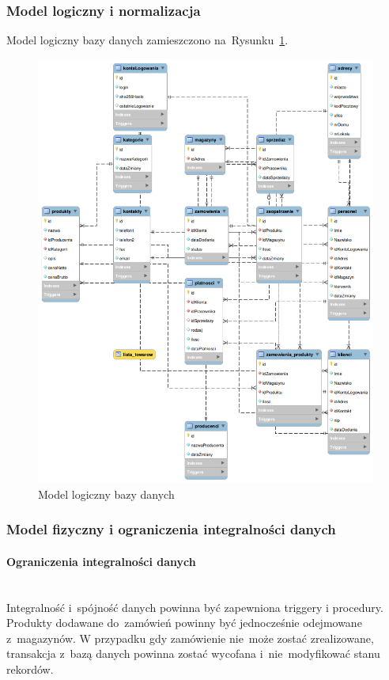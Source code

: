 \documentclass[a4paper, 12pt]{article}
\begin{document}
\subsubsection{Model logiczny i normalizacja}
Model logiczny bazy danych zamieszczono na~Rysunku~\ref{fig:modelLogiczny}.
\begin{figure}[H]
	\includegraphics[width=14cm]{modelLogiczny.png}
	\caption[Model logiczny bazy danych]{Model logiczny bazy danych}
	\label{fig:modelLogiczny}
\end{figure}
\subsubsection{Model fizyczny i ograniczenia integralności danych}
\paragraph{Ograniczenia integralności danych} \mbox{}\\
Integralność i~spójność danych powinna być zapewniona triggery i procedury. Produkty dodawane do~zamówień powinny być jednocześnie odejmowane z~magazynów. W przypadku gdy zamówienie nie~może zostać zrealizowane, transakcja z~bazą danych powinna zostać wycofana i~nie~modyfikować stanu rekordów.
\end{document}
